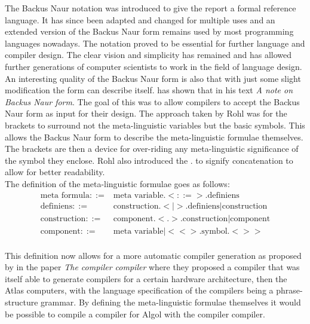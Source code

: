 \documentclass{article}
\begin{document}
The Backus Naur notation was introduced to give the report a formal reference language. It has since been adapted and changed for multiple uses and an extended version of the Backus Naur form remains used by most programming languages nowadays. The notation proved to be essential for further language and compiler design. The clear vision and simplicity has remained and has allowed further generations of computer scientists to work in the field of language design.
\\
An interesting quality of the Backus Naur form is also that with just some slight modification the form can describe itself. \citet{rohl1968note} has shown that in his text \textit{A note on Backus Naur form}. The goal of this was to allow compilers to accept the Backus Naur form as input for their design. The approach taken by Rohl was for the brackets to surround not the meta-linguistic variables but the basic symbols. This allows the Backus Naur form to describe the meta-linguistic formulae themselves. The brackets are then a device for over-riding any meta-linguistic significance of the symbol they enclose. Rohl also introduced the $.$ to signify concatenation to allow for better readability.
\\
The definition of the meta-linguistic formulae goes as follows:
\begin{equation} \label{eq4}
\begin{split}
	\text{meta formula} ::=& \text{meta variable}.<::=>.\text{definiens} \\
	\text{definiens} ::=& \text{construction}.<|>.\text{definiens} | \text{construction} \\
	\text{construction} ::=& \text{component}.<.>.\text{construction} | \text{component} \\
	\text{component} ::=& \text{meta variable} | <<>.\text{symbol}.<>> \\
\end{split}
\end{equation}

This definition now allows for a more automatic compiler generation as proposed by \citet{brooker1963compiler} in the paper \textit{The compiler compiler} where they proposed a compiler that was itself able to generate compilers for a certain hardware architecture, then the Atlas computers, with the language specification of the compilers being a phrase-structure grammar. By defining the meta-linguistic formulae themselves it would be possible to compile a compiler for Algol with the compiler compiler.
\end{document}
